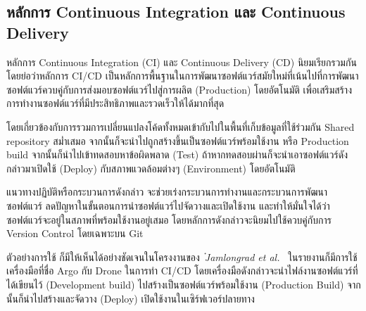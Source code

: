 \documentclass[12pt,one side,openright,a4paper]{cpe-thesis-th}
\newcommand{\thaijustify}[1]{%
  \par\hspace{30pt}\justifying
  #1
}
\begin{document}
\subsection{หลักการ Continuous Integration และ Continuous Delivery}
\thaijustify{
  หลักการ Continuous Integration (CI) และ Continuous Delivery (CD) นิยมเรียกรวมกันโดยย่อว่าหลักการ CI/CD เป็นหลักการพื้นฐานในการพัฒนาซอฟต์แวร์สมัยใหม่ที่เน้นไปที่การพัฒนาซอฟต์แวร์ควบคู่กับการส่งมอบซอฟต์แวร์ไปสู่การผลิต (Production) โดยอัตโนมัติ เพื่อเสริมสร้างการทำงานซอฟต์แวร์ที่มีประสิทธิภาพและรวดเร็วให้ได้มากที่สุด
}
\thaijustify{
  โดยเกี่ยวข้องกับการรวมการเปลี่ยนแปลงโค้ดทั้งหมดเข้ากับไปในพื้นที่เก็บข้อมูลที่ใช้ร่วมกัน Shared repository สม่ำเสมอ จากนั้นก็จะนำไปถูกสร้างขึ้นเป็นซอฟต์แวร์พร้อมใช้งาน หรือ Production build จากนั้นก็นำไปเข้าทดสอบหาข้อผิดพลาด (Test) ถ้าหากทดสอบผ่านก็จะนำเอาซอฟต์แวร์ดังกล่าวมาเปิดใช้ (Deploy) กับสภาพแวดล้อมต่างๆ (Environment) โดยอัตโนมัติ~\cite{fowlerCI}
}
\thaijustify{
  แนวทางปฏิบัติหรือกระบวนการดังกล่าว จะช่วยเร่งกระบวนการทำงานและกระบวนการพัฒนาซอฟต์แวร์ ลดปัญหาในขั้นตอนการนำซอฟต์แวร์ไปจัดวางและเปิดใช้งาน และทำให้มั่นใจได้ว่าซอฟต์แวร์จะอยู่ในสภาพที่พร้อมใช้งานอยู่เสมอ โดยหลักการดังกล่าวจะนิยมไปใช้ควบคู่กับการ Version Control โดยเฉพาะบน Git
}
\thaijustify{
  ตัวอย่างการใช้ ก็มีให้เห็นได้อย่างชัดเจนในโครงงานของ~\textit{๋Jamlongrad et al.}~\cite{nattawat20pgs} ในรายงานก็มีการใช้เครื่องมือที่ชื่อ Argo กับ Drone ในการทำ CI/CD โดยเครื่องมือดังกล่าวจะนำไฟล์งานซอฟต์แวร์ที่ได้เขียนไว้ (Development build) ไปสร้างเป็นซอฟต์แวร์พร้อมใช้งาน (Production Build) จากนั้นก็นำไปสร้างและจัดวาง (Deploy) เปิดใช้งานในเซิร์ฟเวอร์ปลายทาง
}
\end{document}
